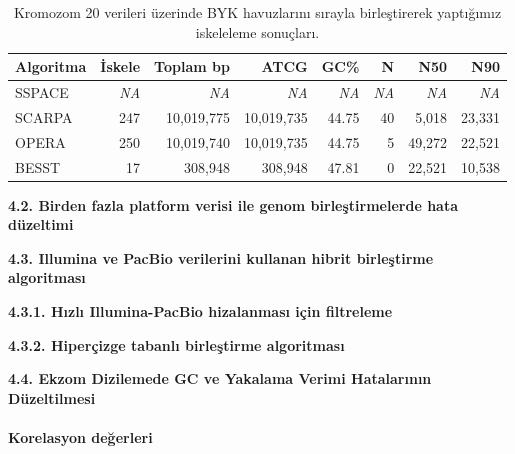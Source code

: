 \documentclass[11pt]{article}
\begin{document}
\begin{table}[htb]
\begin{center}
\begin{tabular}{|l|r|r|r|r|r|r|r}
\hline 
{\bf Algoritma } & {\bf İskele} & {\bf Toplam bp} & {\bf ATCG} & {\bf GC\%} & {\bf N} & {\bf N50} & {\bf N90} \\
\hline
SSPACE &  \textit{NA}  &  \textit{NA}     &     \textit{NA}  &   \textit{NA}   &  \textit{NA}    &  \textit{NA}    &  \textit{NA}   \\
SCARPA &   247	& 10,019,775 &	10,019,735	& 44.75	& 40	& 5,018 &	23,331\\
OPERA  &  250	& 10,019,740	& 10,019,735	& 44.75	& 5	& 49,272	& 22,521 \\
BESST  &  17    & 308,948 & 308,948  & 47.81 & 0  & 22,521 & 10,538 \\ \hline
\end{tabular}
\end{center}
\caption{Kromozom 20 verileri üzerinde BYK havuzlarını sırayla birleştirerek yaptığımız iskeleleme sonuçları.}
\label{tab:chr20h}
\end{table}

{\bf \large 4.2. Birden fazla platform verisi ile genom birleştirmelerde hata düzeltimi}



{\bf \large 4.3. Illumina ve PacBio verilerini kullanan hibrit birleştirme algoritması}

{\bf 4.3.1. Hızlı Illumina-PacBio hizalanması için filtreleme}



{\bf 4.3.2. Hiperçizge tabanlı birleştirme algoritması}




\noindent
{\bf \large 4.4. Ekzom Dizilemede GC ve Yakalama Verimi Hatalarının Düzeltilmesi}

\paragraph{Korelasyon değerleri} 
\end{document}

